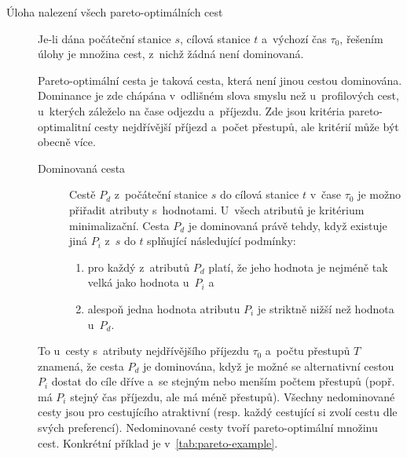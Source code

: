 \begin{description}
	\item[Úloha nalezení všech pareto-optimálních cest] Je-li dána počáteční stanice $s$, cílová stanice $t$ a~výchozí čas $\tau_0$, řešením úlohy je množina cest, z~nichž žádná není dominovaná.
	
	Pareto-optimální cesta je taková cesta, která není jinou cestou dominována. Dominance je zde chápána v~odlišném slova smyslu než u~profilových cest, u~kterých záleželo na čase odjezdu a~příjezdu. Zde jsou kritéria pareto-optimalitní cesty nejdřívější příjezd a~počet přestupů, ale kritérií může být obecně více.

	\begin{description}
		\item[Dominovaná cesta] Cestě $P_d$ z~počáteční stanice $s$ do cílová stanice $t$ v~čase $\tau_0$ je možno přiřadit atributy s~hodnotami. U~všech atributů je kritérium minimalizační. Cesta $P_d$ je dominovaná právě tehdy, když existuje jiná $P_i$ z~$s$ do $t$ splňující následující podmínky:
		\begin{enumerate}[label = \normalfont\itembox{\roman{enumi})}]
			\item pro každý z~atributů $P_d$ platí, že jeho hodnota je nejméně tak velká jako hodnota u~$P_i$ a
			\item alespoň jedna hodnota atributu $P_i$ je striktně nižší než hodnota u~$P_d$.  
		\end{enumerate}
	\end{description}
		
		To u~cesty s~atributy nejdřívějšího příjezdu $\tau_0$ a~počtu přestupů $T$ znamená, že cesta $P_d$ je dominována, když je možné se alternativní cestou $P_i$ dostat do cíle dříve a~se stejným nebo menším počtem přestupů (popř. má $P_i$ stejný čas příjezdu, ale má méně přestupů). Všechny nedominované cesty jsou pro cestujícího atraktivní (resp. každý cestující si zvolí cestu dle svých preferencí). Nedominované cesty tvoří pareto-optimální množinu cest. Konkrétní příklad je v~\autoref{tab:pareto-example}.


\end{description}
